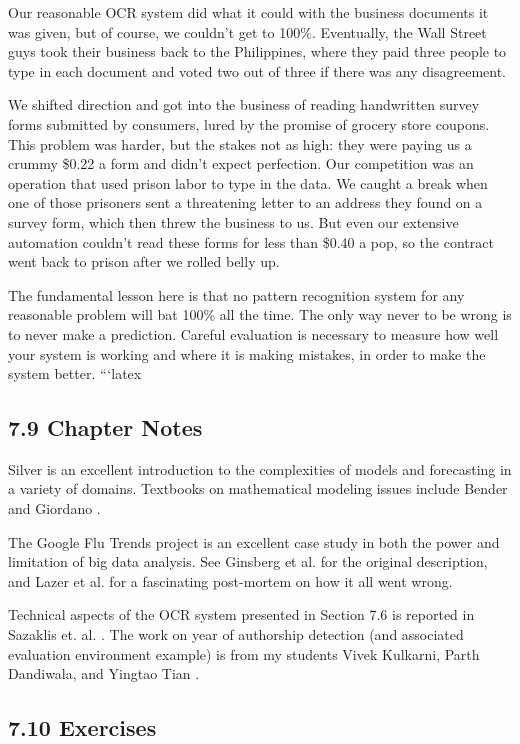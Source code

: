 \documentclass[10pt]{article}
\begin{document}
Our reasonable OCR system did what it could with the business documents it was given, but of course, we couldn't get to 100\%. Eventually, the Wall Street guys took their business back to the Philippines, where they paid three people to type in each document and voted two out of three if there was any disagreement.

We shifted direction and got into the business of reading handwritten survey forms submitted by consumers, lured by the promise of grocery store coupons. This problem was harder, but the stakes not as high: they were paying us a crummy \$0.22 a form and didn't expect perfection. Our competition was an operation that used prison labor to type in the data. We caught a break when one of those prisoners sent a threatening letter to an address they found on a survey form, which then threw the business to us. But even our extensive automation couldn't read these forms for less than \$0.40 a pop, so the contract went back to prison after we rolled belly up.

The fundamental lesson here is that no pattern recognition system for any reasonable problem will bat 100\% all the time. The only way never to be wrong is to never make a prediction. Careful evaluation is necessary to measure how well your system is working and where it is making mistakes, in order to make the system better.
```latex
\subsection*{7.9 Chapter Notes}
Silver \cite{Sil12} is an excellent introduction to the complexities of models and forecasting in a variety of domains. Textbooks on mathematical modeling issues include Bender \cite{Ben12} and Giordano \cite{GFH13}.

The Google Flu Trends project is an excellent case study in both the power and limitation of big data analysis. See Ginsberg et al. \cite{GMP09} for the original description, and Lazer et al. \cite{LKKV14} for a fascinating post-mortem on how it all went wrong.

Technical aspects of the OCR system presented in Section 7.6 is reported in Sazaklis et. al. \cite{SAMS97}. The work on year of authorship detection (and associated evaluation environment example) is from my students Vivek Kulkarni, Parth Dandiwala, and Yingtao Tian \cite{KTDS17}.

\subsection*{7.10 Exercises }
\end{document}

